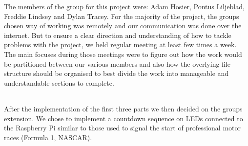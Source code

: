 The members of the group for this project were: Adam Hosier, Pontus Liljeblad, Freddie Lindsey and Dylan Tracey. For the majority of the project, the groups chosen way of working was remotely and our communication was done over the internet. But to ensure a clear direction and understanding of how to tackle problems with the project, we held regular meeting at least few times a week. The main focuses during those meetings were to figure out how the work would be partitioned between our various members and also how the overlying file structure should be organised to best divide the work into manageable and understandable sections to complete.

~\\

After the implementation of the first three parts we then decided on the groups extension. We chose to implement a countdown sequence on LEDs connected to the Raspberry Pi similar to those used to signal the start of professional motor races (Formula 1, NASCAR).
